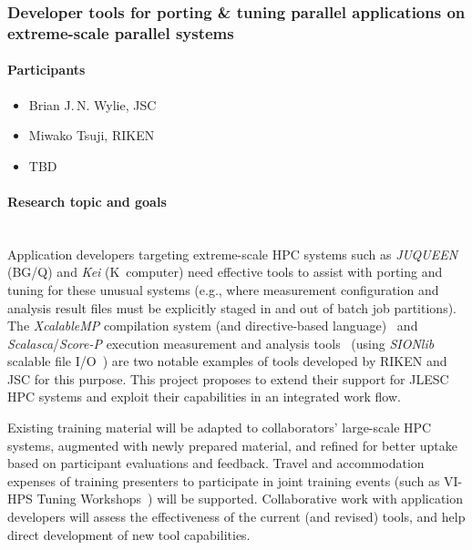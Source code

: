 
\subsubsection{Developer tools for porting \& tuning parallel applications on extreme-scale parallel systems}
\label{sec.report.bjnw} %

\begin{refsection}

\paragraph{Participants}%

\begin{itemize}
\item Brian J.\,N. Wylie, JSC
\item Miwako Tsuji, RIKEN
\item TBD
\end{itemize}


\paragraph{Research topic and goals}~\\

Application developers targeting extreme-scale HPC systems such as
\textsl{JUQUEEN} (BG/Q) and \textsl{Kei} (K~computer) need effective
tools to assist with porting and tuning for these unusual systems (e.g.,
where measurement configuration and analysis result files must be
explicitly staged in and out of batch job partitions). The
\textit{XcalableMP} compilation system (and directive-based
language)~\cite{10.1109/ICPPW.2010.62,10.1109/ICPP.2013.58}  and
\textit{Scalasca}/\textit{Score-P} execution measurement and analysis
tools~\cite{geimer_ea:2010:scalascaarchitecture,knuepfer:2011:scorep}
(using \textit{SIONlib} scalable file
I/O~\cite{frings_ea:2009:parallelio}) are two notable examples of tools
developed by RIKEN and JSC for this purpose. This project proposes to
extend their support for JLESC HPC systems and exploit their
capabilities in an integrated work flow. 

Existing training material will be adapted to collaborators' large-scale
HPC systems, augmented with newly prepared material, and refined for
better uptake based on participant evaluations and feedback. Travel and
accommodation expenses of training presenters to participate in joint
training events (such as VI-HPS Tuning Workshops~\cite{VI-HPS-TWS}) will
be supported. Collaborative work with application developers will assess
the effectiveness of the current (and revised) tools, and help direct
development of new tool capabilities.



\end{refsection}
